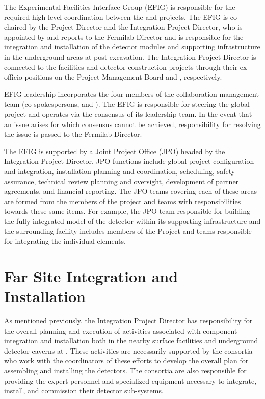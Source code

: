 The Experimental Facilities Interface Group (EFIG) is responsible for
the required high-level coordination between the  and 
projects.  The EFIG is co-chaired by the  Project Director and the
Integration Project Director, who is appointed by and reports to the
Fermilab Director and is responsible for the integration and
installation of the detector modules and supporting 
infrastructure in the underground areas at \surf post-excavation.  The
Integration Project Director is connected to the facilities and
detector construction projects through their ex-officio positions on
the  Project Management Board and  ,
respectively.

EFIG leadership incorporates the four members of the 
collaboration management team (co-spokespersons,  and ).
The EFIG is responsible for
steering the global project and operates via the consensus of its
leadership team.  In the event that an issue arises for which
consensus cannot be achieved, responsibility for resolving the issue
is passed to the Fermilab Director.

The EFIG is supported by a Joint Project Office (JPO) headed by the
Integration Project Director.  JPO functions include global project
configuration and integration, installation planning and coordination,
scheduling, safety assurance, technical review planning and oversight,
development of partner agreements, and financial reporting.  The JPO
teams covering each of these areas are formed from the members of the
 project and   teams with
responsibilities towards these same items.  For example, the JPO team
responsible for building the fully integrated model of the detector
within its supporting infrastructure and the surrounding facility
includes members of the  Project and  
teams responsible for integrating the individual elements.

\section{Far Site Integration and Installation}
\label{sec:far_site}

As mentioned previously, the Integration Project Director has
responsibility for the overall planning and execution of activities
associated with component integration and installation both in the
nearby surface facilities and underground detector caverns at \surf.
These activities are necessarily supported by the  consortia who
work with the coordinators of these efforts to develop the overall
plan for assembling and installing the detectors.  The consortia are
also responsible for providing the expert personnel and specialized
equipment necessary to integrate, install, and commission their
detector sub-systems.

